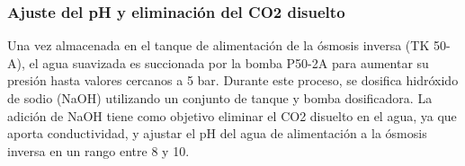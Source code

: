 \subsubsection{Ajuste del pH y eliminación del CO2 disuelto }

Una vez almacenada en el tanque de alimentación de la ósmosis inversa (TK 50-A), el agua suavizada es succionada por la bomba P50-2A para aumentar su presión hasta valores cercanos a 5 bar. Durante este proceso, se dosifica hidróxido de sodio (NaOH) utilizando un conjunto de tanque y bomba dosificadora. La adición de NaOH tiene como objetivo eliminar el CO2 disuelto en el agua, ya que aporta conductividad, y ajustar el pH del agua de alimentación a la ósmosis inversa en un rango entre 8 y 10.\\